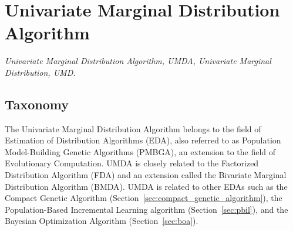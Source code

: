 

\section{Univariate Marginal Distribution Algorithm} 
\label{sec:umda}

\emph{Univariate Marginal Distribution Algorithm, UMDA, Univariate Marginal Distribution, UMD.}

\subsection{Taxonomy}
The Univariate Marginal Distribution Algorithm belongs to the field of Estimation of Distribution Algorithms (EDA), also referred to as Population Model-Building Genetic Algorithms (PMBGA), an extension to the field of Evolutionary Computation.
UMDA is closely related to the Factorized Distribution Algorithm (FDA) and an extension called the Bivariate Marginal Distribution Algorithm (BMDA).
UMDA is related to other EDAs such as the Compact Genetic Algorithm (Section~\ref{sec:compact_genetic_algorithm}), the Population-Based Incremental Learning algorithm (Section~\ref{sec:pbil}), and the Bayesian Optimization Algorithm (Section~\ref{sec:boa}).

